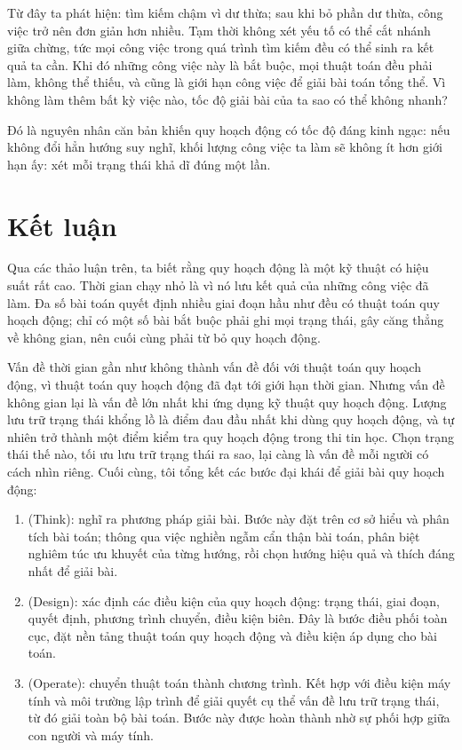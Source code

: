 \documentclass[11pt]{article}
\begin{document}
Từ đây ta phát hiện: tìm kiếm chậm vì dư thừa; sau khi bỏ phần dư thừa, công
việc trở nên đơn giản hơn nhiều. Tạm thời không xét yếu tố có thể cắt nhánh
giữa chừng, tức mọi công việc trong quá trình tìm kiếm đều có thể sinh ra kết
quả ta cần. Khi đó những công việc này là bắt buộc, mọi thuật toán đều phải
làm, không thể thiếu, và cũng là giới hạn công việc để giải bài toán tổng
thể. Vì không làm thêm bất kỳ việc nào, tốc độ giải bài của ta sao có thể
không nhanh?

Đó là nguyên nhân căn bản khiến quy hoạch động có tốc độ đáng kinh ngạc: nếu
không đổi hẳn hướng suy nghĩ, khối lượng công việc ta làm sẽ không ít hơn
giới hạn ấy: xét mỗi trạng thái khả dĩ đúng một lần.

\section{Kết luận}

Qua các thảo luận trên, ta biết rằng quy hoạch động là một kỹ thuật có hiệu
suất rất cao. Thời gian chạy nhỏ là vì nó lưu kết quả của những công việc đã
làm. Đa số bài toán quyết định nhiều giai đoạn hầu như đều có thuật toán quy
hoạch động; chỉ có một số bài bắt buộc phải ghi mọi trạng thái, gây căng
thẳng về không gian, nên cuối cùng phải từ bỏ quy hoạch động.

Vấn đề thời gian gần như không thành vấn đề đối với thuật toán quy hoạch
động, vì thuật toán quy hoạch động đã đạt tới giới hạn thời gian. Nhưng vấn đề
không gian lại là vấn đề lớn nhất khi ứng dụng kỹ thuật quy hoạch động. Lượng
lưu trữ trạng thái khổng lồ là điểm đau đầu nhất khi dùng quy hoạch động, và
tự nhiên trở thành một điểm kiểm tra quy hoạch động trong thi tin học. Chọn
trạng thái thế nào, tối ưu lưu trữ trạng thái ra sao, lại càng là vấn đề mỗi
người có cách nhìn riêng. Cuối cùng, tôi tổng kết các bước đại khái để giải
bài quy hoạch động:

\begin{enumerate}
  \item {} (Think): nghĩ ra phương pháp giải bài. Bước này đặt
  trên cơ sở hiểu và phân tích bài toán; thông qua việc nghiền ngẫm cẩn thận
  bài toán, phân biệt nghiêm túc ưu khuyết của từng hướng, rồi chọn hướng
  hiệu quả và thích đáng nhất để giải bài.
  \item {} (Design): xác định các điều kiện của quy hoạch
  động: trạng thái, giai đoạn, quyết định, phương trình chuyển, điều kiện
  biên. Đây là bước điều phối toàn cục, đặt nền tảng thuật toán quy hoạch
  động và điều kiện áp dụng cho bài toán.
  \item {} (Operate): chuyển thuật toán thành chương trình. Kết
  hợp với điều kiện máy tính và môi trường lập trình để giải quyết cụ thể vấn
  đề lưu trữ trạng thái, từ đó giải toàn bộ bài toán. Bước này được hoàn
  thành nhờ sự phối hợp giữa con người và máy tính.
\end{enumerate}
\end{document}
